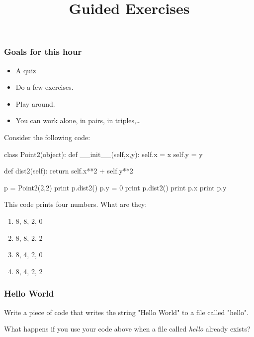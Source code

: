 
\title{Guided Exercises}
\usepackage{amsmath}

\frame{\maketitle}

\begin{frame}
\frametitle{Goals for this hour}

\begin{itemize}
\item A quiz
\item Do a few exercises.
\item Play around.
\item You can work alone, in pairs, in triples,\ldots
\end{itemize}

\end{frame}


\begin{frame}[fragile]
{}


Consider the following code:

\begin{python}
class Point2(object):
    def __init__(self,x,y):
        self.x = x
        self.y = y

    def dist2(self):
        return self.x**2 + self.y**2 

p = Point2(2,2)
print p.dist2()
p.y = 0
print p.dist2()
print p.x
print p.y
\end{python}

This code prints four numbers. What are they:

\begin{enumerate}[a]
\item 8, 8, 2, 0
\item 8, 8, 2, 2
\item 8, 4, 2, 0
\item 8, 4, 2, 2
\end{enumerate}

\end{frame}

\begin{frame}[fragile]
\frametitle{Hello World}

Write a piece of code that writes the string "Hello World" to a file called "hello".

\bigskip
What happens if you use your code above when a file called \textit{hello} already exists?

\end{frame}

